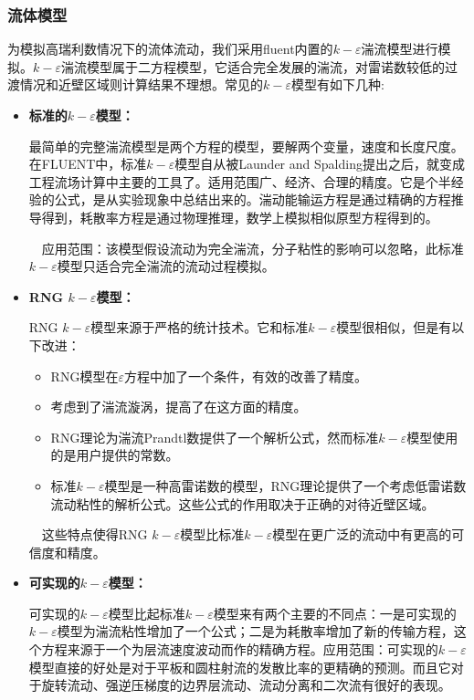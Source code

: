 \documentclass[UTF8]{article} %
\begin{document}
\subsubsection{流体模型}
为模拟高瑞利数情况下的流体流动，我们采用fluent内置的$k-\varepsilon$湍流模型进行模拟。$k-\varepsilon$湍流模型属于二方程模型，它适合完全发展的湍流，对雷诺数较低的过渡情况和近壁区域则计算结果不理想。常见的$k-\varepsilon$模型有如下几种\cite{tuan}:

\begin{itemize}
  \item \textbf{标准的$k-\varepsilon$模型：}
  
  最简单的完整湍流模型是两个方程的模型，要解两个变量，速度和长度尺度。在FLUENT中，标准$k-\varepsilon$模型自从被Launder and Spalding提出之后，就变成工程流场计算中主要的工具了。适用范围广、经济、合理的精度。它是个半经验的公式，是从实验现象中总结出来的。湍动能输运方程是通过精确的方程推导得到，耗散率方程是通过物理推理，数学上模拟相似原型方程得到的。

　应用范围：该模型假设流动为完全湍流，分子粘性的影响可以忽略，此标准$k-\varepsilon$模型只适合完全湍流的流动过程模拟。
  \item \textbf{RNG $k-\varepsilon$模型：}
  
  RNG $k-\varepsilon$模型来源于严格的统计技术。它和标准$k-\varepsilon$模型很相似，但是有以下改进：
  \begin{itemize}
    \item RNG模型在$\varepsilon$方程中加了一个条件，有效的改善了精度。
    \item 考虑到了湍流漩涡，提高了在这方面的精度。
    \item RNG理论为湍流Prandtl数提供了一个解析公式，然而标准$k-\varepsilon$模型使用的是用户提供的常数。
    \item 标准$k-\varepsilon$模型是一种高雷诺数的模型，RNG理论提供了一个考虑低雷诺数流动粘性的解析公式。这些公式的作用取决于正确的对待近壁区域。
  \end{itemize}
　这些特点使得RNG $k-\varepsilon$模型比标准$k-\varepsilon$模型在更广泛的流动中有更高的可信度和精度。
  \item \textbf{可实现的$k-\varepsilon$模型：}
  
  可实现的$k-\varepsilon$模型比起标准$k-\varepsilon$模型来有两个主要的不同点：一是可实现的$k-\varepsilon$模型为湍流粘性增加了一个公式；二是为耗散率增加了新的传输方程，这个方程来源于一个为层流速度波动而作的精确方程。应用范围：可实现的$k-\varepsilon$模型直接的好处是对于平板和圆柱射流的发散比率的更精确的预测。而且它对于旋转流动、强逆压梯度的边界层流动、流动分离和二次流有很好的表现。

\end{itemize}
\end{document}
